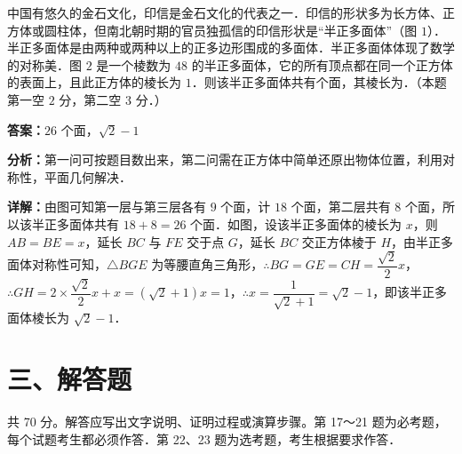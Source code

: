 \begin{question}[points=5]
中国有悠久的金石文化，印信是金石文化的代表之一．印信的形状多为长方体、正方体或圆柱体，但南北朝时期的官员独孤信的印信形状是“半正多面体”（图 $1$）．半正多面体是由两种或两种以上的正多边形围成的多面体．半正多面体体现了数学的对称美．图 $2$ 是一个棱数为 $48$ 的半正多面体，它的所有顶点都在同一个正方体的表面上，且此正方体的棱长为 $1$．则该半正多面体共有个面，其棱长为．（本题第一空 $2$ 分，第二空 $3$ 分．）
\fillin[{$26$ 个面，$\sqrt{2}-1$}]
\begin{solution}
\textbf{答案：}$26$ 个面，$\sqrt{2}-1$

\textbf{分析：}第一问可按题目数出来，第二问需在正方体中简单还原出物体位置，利用对称性，平面几何解决．

\textbf{详解：}由图可知第一层与第三层各有 $9$ 个面，计 $18$ 个面，第二层共有 $8$ 个面，所以该半正多面体共有 $18+8=26$ 个面．如图，设该半正多面体的棱长为 $x$，则 $AB=BE=x$，延长 $BC$ 与 $FE$ 交于点 $G$，延长 $BC$ 交正方体棱于 $H$，由半正多面体对称性可知，$\triangle BGE$ 为等腰直角三角形，$\therefore BG=GE=CH=\dfrac{\sqrt{2}}{2}x$，$\therefore GH=2\times\dfrac{\sqrt{2}}{2}x+x=(\sqrt{2}+1)x=1$，$\therefore x=\dfrac{1}{\sqrt{2}+1}=\sqrt{2}-1$，即该半正多面体棱长为 $\sqrt{2}-1$．
\end{solution}
\end{question}

\section*{三、解答题}
共 70 分。解答应写出文字说明、证明过程或演算步骤。第 17～21 题为必考题，每个试题考生都必须作答．第 22、23 题为选考题，考生根据要求作答．

